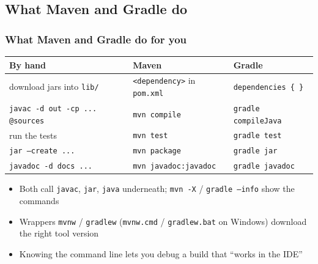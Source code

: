 \documentclass[aspectratio=169,10pt,compress]{beamer}
\begin{document}

\subsection[Maven]{What Maven and Gradle do}




\begin{frame}[t,fragile] \frametitle{What Maven and Gradle do for you}
  \small
  \begin{tabular}{@{}L{0.3\textwidth}L{0.3\textwidth}L{0.32\textwidth}@{}}
    \toprule
    \textbf{By hand}                                   & \textbf{Maven}               & \textbf{Gradle} \\
    \midrule
    download jars into \texttt{lib/}                   & \texttt{<dependency>} in \texttt{pom.xml} & \texttt{dependencies \{ \}} \\
    \texttt{javac -d out -cp ... @sources}             & \texttt{mvn compile}         & \texttt{gradle compileJava} \\
    run the tests                                      & \texttt{mvn test}            & \texttt{gradle test} \\
    \texttt{jar --create ...}                          & \texttt{mvn package}         & \texttt{gradle jar} \\
    \texttt{javadoc -d docs ...}                       & \texttt{mvn javadoc:javadoc} & \texttt{gradle javadoc} \\
    \bottomrule
  \end{tabular}

  \vspace{0.5em}
  \begin{itemize}\small
    \item Both call \texttt{javac}, \texttt{jar}, \texttt{java} underneath; \texttt{mvn -X} / \texttt{gradle --info} show the commands
    \item Wrappers \texttt{mvnw} / \texttt{gradlew} (\texttt{mvnw.cmd} / \texttt{gradlew.bat} on Windows) download the right tool version
    \item Knowing the command line lets you debug a build that ``works in the IDE''
  \end{itemize}
\end{frame}
\end{document}

